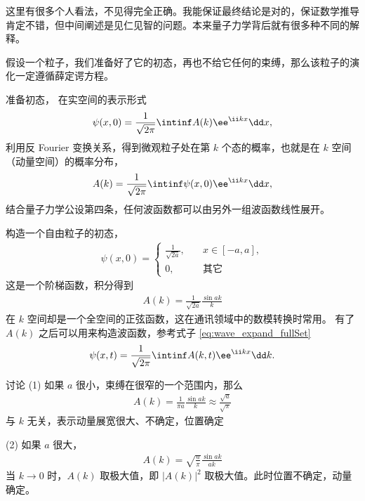 这里有很多个人看法，不见得完全正确。我能保证最终结论是对的，保证数学推导肯定不错，但中间阐述是见仁见智的问题。本来量子力学背后就有很多种不同的解释。

假设一个粒子，我们准备好了它的初态，再也不给它任何的束缚，那么该粒子的演化一定遵循薛定谔方程。


准备初态，
在实空间的表示形式
\begin{eqnarray}
    \psi(x,0) = \frac{1}{\sqrt{2\pi}} \intinf A(k) \ee^{\ii kx} \dd x, 
\end{eqnarray}
利用反 Fourier 变换关系，得到微观粒子处在第 $k$ 个态的概率，也就是在 $k$ 空间（动量空间）的概率分布，
\begin{eqnarray}
    A(k) = \frac{1}{\sqrt{2\pi}} \intinf \psi(x,0) \ee^{\ii kx} \dd x,
\end{eqnarray}
结合量子力学公设第四条，任何波函数都可以由另外一组波函数线性展开。

构造一个自由粒子的初态，
\begin{eqnarray}
    \psi(x,0) = 
    \begin{cases}
        \frac1{\sqrt{2a}},\quad &x\in[-a,a],\\
        0, \quad &\text{其它}
    \end{cases}
\end{eqnarray}
这是一个阶梯函数，积分得到
\begin{eqnarray}
    A(k) = \frac1{\sqrt{2a}} \frac{\sin ak}{k}
\end{eqnarray}
在 $k$ 空间却是一个全空间的正弦函数，这在通讯领域中的数模转换时常用。
有了 $A(k)$ 之后可以用来构造波函数，参考式子 \eqref{eq:wave_expand_fullSet}
\begin{eqnarray}
    \psi(x,t) = \frac1{\sqrt{2\pi}} \intinf A(k,t) \ee^{\ii k x} \dd k. 
\end{eqnarray}

讨论 (1) 如果 $a$ 很小，束缚在很窄的一个范围内，那么
\begin{eqnarray}
    A(k) = \frac{1}{\pi a} \frac{\sin ak}{k} \approx \frac{\sqrt{a}}{\sqrt\pi}
\end{eqnarray}
与 $k$ 无关，表示动量展宽很大、不确定，位置确定

(2) 如果 $a$ 很大，
\begin{eqnarray}
    A(k) = \sqrt{\frac{a}{\pi}} \frac{\sin ak}{ak}
\end{eqnarray}
当 $k\rightarrow 0$ 时，$A(k)$ 取极大值，即 $|A(k)|^2$ 取极大值。此时位置不确定，动量确定。

